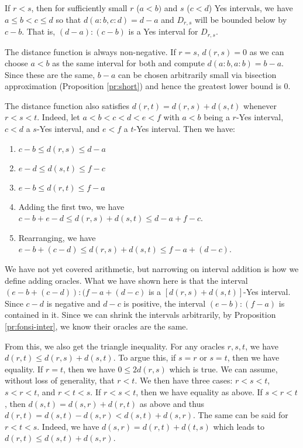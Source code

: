 \documentclass[12pt]{article}
\theoremstyle{remark}
\begin{document}
If $r<s$, then for sufficiently small $r$ ($a\lt b)$ and $s$ ($c\lt d$) Yes intervals, we have $a\leq b<c \leq d$ so that $d(a:b,c:d) = d-a$ and $D_{r,s}$ will be bounded below by $c-b$. That is, $(d-a):(c-b)$ is a Yes interval for $D_{r,s}$.

The distance function is always non-negative. If $r=s$, $d(r,s)=0$ as we can choose $a<b$ as the same interval for both and compute $d(a:b,a:b)= b-a$. Since these are the same, $b-a$ can be chosen arbitrarily small via bisection approximation (Proposition \ref{pr:short}) and hence the greatest lower bound is 0. 

The distance function also satisfies $d(r,t) = d(r,s) + d(s,t)$ whenever $r < s < t$. Indeed, let $a<b<c<d<e<f$ with $a\lt b$ being a $r$-Yes interval, $c\lt d$ a $s$-Yes interval, and $e\lt f$ a $t$-Yes interval. Then we have: 
\begin{enumerate}
\item $c-b \leq d(r,s) \leq d-a$
\item $e-d \leq d(s,t) \leq f-c$
\item $e-b \leq d(r,t) \leq f-a$
\item Adding the first two, we have $c-b + e-d \leq d(r,s) + d(s,t) \leq d-a + f-c$.
\item Rearranging, we have $e-b + (c-d) \leq d(r,s) + d(s,t) \leq f-a + (d-c)$.
\end{enumerate}
We have not yet covered arithmetic, but narrowing on interval addition is how we define adding oracles. What we have shown here is that the interval $(e-b + (c-d)): (f-a + (d-c)$ is a $[d(r,s) + d(s,t)]$-Yes interval. Since $c-d$ is negative and $d-c$ is positive, the interval $(e-b):(f-a)$ is contained in it. Since we can shrink the intervals arbitrarily, by Proposition \ref{pr:fonsi-inter}, we know their oracles are the same. 

From this, we also get the triangle inequality. For any oracles $r, s, t$, we have $d(r,t) \leq d(r,s) + d(s,t)$.  To argue this, if $s = r$ or $s=t$, then we have equality. If $r=t$, then we have $0 \leq 2 d(r,s)$ which is true. We can assume, without loss of generality, that $r < t$. We then have three cases: $r< s< t$, $s < r < t$, and $r< t  < s$. If $r < s< t$, then we have equality as above. If $s < r < t$, then $d(s,t) = d(s,r) + d(r,t)$ as above and thus $d(r,t) = d(s,t) - d(s,r) < d(s,t) + d(s,r)$. The same can be said for $r < t < s$. Indeed,  we have $d(s,r) = d(r,t) + d(t,s)$ which leads to $d(r,t) \leq d(s,t) + d(s,r)$.
\end{document}
